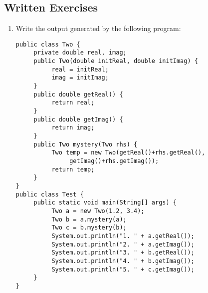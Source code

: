 
\subsection{Written Exercises}

\setcounter{counter}{1}
\begin{enumerate}[label={\arabic{counter}\addtocounter{counter}{1}}.]

\item Write the output generated by the following program:
\begin{lstlisting}
public class Two {
     private double real, imag;
     public Two(double initReal, double initImag) {
          real = initReal;
          imag = initImag;
     }
     public double getReal() {
          return real;
     }
     public double getImag() {
          return imag;
     }
     public Two mystery(Two rhs) {
          Two temp = new Two(getReal()+rhs.getReal(), 
               getImag()+rhs.getImag());
          return temp;
     }
}
public class Test {
     public static void main(String[] args) {
          Two a = new Two(1.2, 3.4);
          Two b = a.mystery(a);
          Two c = b.mystery(b);
          System.out.println("1. " + a.getReal());
          System.out.println("2. " + a.getImag());
          System.out.println("3. " + b.getReal());
          System.out.println("4. " + b.getImag());
          System.out.println("5. " + c.getImag());
     }
}
\end{lstlisting}


\end{enumerate}

